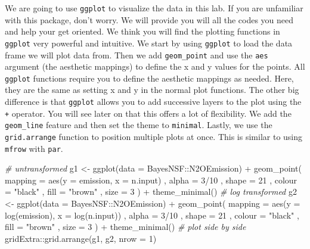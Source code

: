 \documentclass[
]{article}
\newenvironment{Shaded}{\begin{snugshade}}{\end{snugshade}}
\newcommand{\AttributeTok}[1]{\textcolor[rgb]{0.77,0.63,0.00}{#1}}
\newcommand{\CommentTok}[1]{\textcolor[rgb]{0.56,0.35,0.01}{\textit{#1}}}
\newcommand{\DecValTok}[1]{\textcolor[rgb]{0.00,0.00,0.81}{#1}}
\newcommand{\FunctionTok}[1]{\textcolor[rgb]{0.00,0.00,0.00}{#1}}
\newcommand{\NormalTok}[1]{#1}
\newcommand{\OtherTok}[1]{\textcolor[rgb]{0.56,0.35,0.01}{#1}}
\newcommand{\SpecialCharTok}[1]{\textcolor[rgb]{0.00,0.00,0.00}{#1}}
\newcommand{\StringTok}[1]{\textcolor[rgb]{0.31,0.60,0.02}{#1}}
\begin{document}
We are going to use \texttt{ggplot} to visualize the data in this lab.
If you are unfamiliar with this package, don't worry. We will provide
you will all the codes you need and help your get oriented. We think you
will find the plotting functions in \texttt{ggplot} very powerful and
intuitive. We start by using \texttt{ggplot} to load the data frame we
will plot data from. Then we add \texttt{geom\_point} and use the
\texttt{aes} argument (the aesthetic mappings) to define the x and y
values for the points. All \texttt{ggplot} functions require you to
define the aesthetic mappings as needed. Here, they are the same as
setting x and y in the normal plot functions. The other big difference
is that \texttt{ggplot} allows you to add successive layers to the plot
using the \texttt{+} operator. You will see later on that this offers a
lot of flexibility. We add the \texttt{geom\_line} feature and then set
the theme to \texttt{minimal}. Lastly, we use the \texttt{grid.arrange}
function to position multiple plots at once. This is similar to using
\texttt{mfrow} with \texttt{par}.

\begin{Shaded}
\begin{Highlighting}[]
\CommentTok{\# untransformed}
\NormalTok{g1 }\OtherTok{\textless{}{-}} \FunctionTok{ggplot}\NormalTok{(}\AttributeTok{data =}\NormalTok{ BayesNSF}\SpecialCharTok{::}\NormalTok{N2OEmission) }\SpecialCharTok{+}
  \FunctionTok{geom\_point}\NormalTok{(}
    \AttributeTok{mapping =} \FunctionTok{aes}\NormalTok{(}\AttributeTok{y =}\NormalTok{ emission, }\AttributeTok{x =}\NormalTok{ n.input)}
\NormalTok{    , }\AttributeTok{alpha =} \DecValTok{3}\SpecialCharTok{/}\DecValTok{10}
\NormalTok{    , }\AttributeTok{shape =} \DecValTok{21}
\NormalTok{    , }\AttributeTok{colour =} \StringTok{"black"}
\NormalTok{    , }\AttributeTok{fill =} \StringTok{"brown"}
\NormalTok{    , }\AttributeTok{size =} \DecValTok{3}
\NormalTok{  ) }\SpecialCharTok{+}
  \FunctionTok{theme\_minimal}\NormalTok{()}
\CommentTok{\# log transformed}
\NormalTok{g2 }\OtherTok{\textless{}{-}} \FunctionTok{ggplot}\NormalTok{(}\AttributeTok{data =}\NormalTok{ BayesNSF}\SpecialCharTok{::}\NormalTok{N2OEmission) }\SpecialCharTok{+}
  \FunctionTok{geom\_point}\NormalTok{(}
    \AttributeTok{mapping =} \FunctionTok{aes}\NormalTok{(}\AttributeTok{y =} \FunctionTok{log}\NormalTok{(emission), }\AttributeTok{x =} \FunctionTok{log}\NormalTok{(n.input))}
\NormalTok{    , }\AttributeTok{alpha =} \DecValTok{3}\SpecialCharTok{/}\DecValTok{10}
\NormalTok{    , }\AttributeTok{shape =} \DecValTok{21}
\NormalTok{    , }\AttributeTok{colour =} \StringTok{"black"}
\NormalTok{    , }\AttributeTok{fill =} \StringTok{"brown"}
\NormalTok{    , }\AttributeTok{size =} \DecValTok{3}
\NormalTok{  ) }\SpecialCharTok{+}
  \FunctionTok{theme\_minimal}\NormalTok{() }
\CommentTok{\# plot side by side}
\NormalTok{gridExtra}\SpecialCharTok{::}\FunctionTok{grid.arrange}\NormalTok{(g1, g2, }\AttributeTok{nrow =} \DecValTok{1}\NormalTok{)}
\end{Highlighting}
\end{Shaded}
\end{document}
